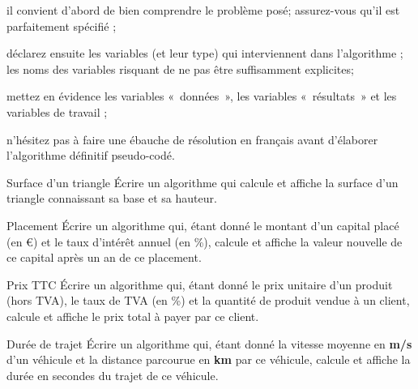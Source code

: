 	\begin{liste}
	\item {
		il convient d’abord de bien comprendre le problème posé; assurez-vous
		qu’il est parfaitement spécifié ;}
	\item {
		déclarez ensuite les variables (et leur type) qui interviennent dans
		l’algorithme ; les noms des variables risquant de ne pas être
		suffisamment explicites;}
	\item {
		mettez en évidence les variables «~données~», les variables
		«~résultats~» et les variables de travail ;}
	\item {
		n’hésitez pas à faire une ébauche de résolution en français avant
		d’élaborer l’algorithme définitif pseudo-codé.}
	\end{liste}

\begin{Exercice}{Surface d'un triangle}
	Écrire un algorithme qui calcule et affiche la surface
	d'un triangle connaissant sa base et sa hauteur.
	
	\begin{Solution}
	\end{Solution}
\end{Exercice}

\begin{Exercice}{Placement}
	Écrire un algorithme qui, étant donné le montant d’un capital placé (en
	€) et le taux d’intérêt annuel (en \%), calcule et affiche la valeur
	nouvelle de ce capital après un an de ce placement.
\end{Exercice}

\begin{Exercice}{Prix TTC}
	Écrire un algorithme qui, étant donné le prix unitaire d’un produit
	(hors TVA), le taux de TVA (en \%) et la quantité de produit vendue à
	un client, calcule et affiche le prix total à payer par ce client.
\end{Exercice}

\begin{Exercice}{Durée de trajet}
	Écrire un algorithme qui, étant donné la vitesse moyenne en \textbf{m/s}
	d’un véhicule et la distance parcourue en \textbf{km} par ce véhicule,
	calcule et affiche la durée en secondes du trajet de ce véhicule.
\end{Exercice}

